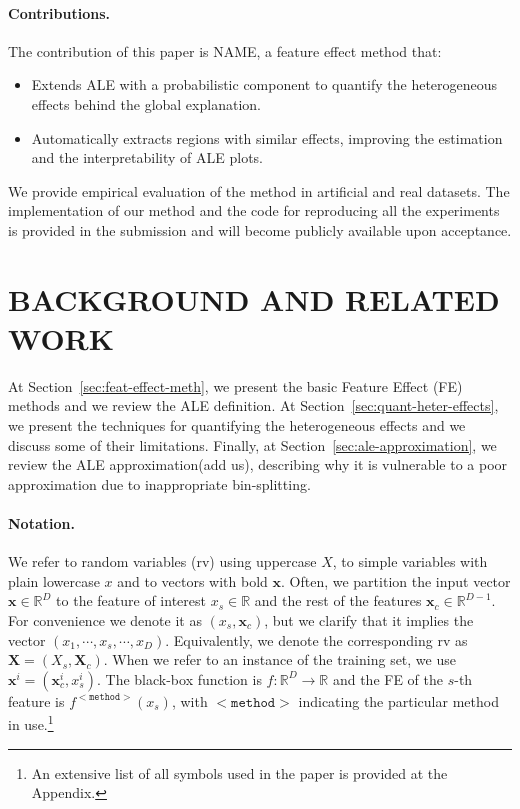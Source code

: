 \documentclass[twoside]{article}
\newcommand{\xc}{\mathbf{x}_c}
\newcommand{\xb}{\mathbf{x}}
\begin{document}
\paragraph{Contributions.} The contribution of this paper is NAME, a
feature effect method that:

\begin{itemize}
\item Extends ALE with a probabilistic component to quantify the
  heterogeneous effects behind the global explanation.
\item Automatically extracts regions with similar effects, improving
  the estimation and the interpretability of ALE plots.
\end{itemize}

We provide empirical evaluation of the method in artificial and real
datasets. The implementation of our method and the code for
reproducing all the experiments is provided in the submission and will
become publicly available upon acceptance.


\section{BACKGROUND AND RELATED WORK}

At Section~\ref{sec:feat-effect-meth}, we present the basic Feature
Effect (FE) methods and we review the ALE
definition\citep{apley2020visualizing}. At
Section~\ref{sec:quant-heter-effects}, we present the techniques for
quantifying the heterogeneous effects and we discuss some of their
limitations. Finally, at Section~\ref{sec:ale-approximation}, we
review the ALE approximation\citep{apley2020visualizing}(add us),
describing why it is vulnerable to a poor approximation due to
inappropriate bin-splitting.

\paragraph{Notation.} We refer to random variables (rv) using
uppercase \( X \), to simple variables with plain lowercase \( x \)
and to vectors with bold \( \xb \). Often, we partition the input
vector \(\xb \in \mathbb{R}^D\) to the feature of interest
\(x_s \in \mathbb{R} \) and the rest of the features
\(\xc \in \mathbb{R}^{D-1}\). For convenience we denote it as
\((x_s, \mathbf{x}_c)\), but we clarify that it implies the vector
\((x_1, \cdots , x_s, \cdots, x_D)\). Equivalently, we denote the
corresponding rv as \(\mathbf{X} = (X_s, \mathbf{X}_c)\). When we
refer to an instance of the training set, we use
\(\xb^i= (\xc^i, x_s^i) \). The black-box function is
\(f : \mathbb{R}^D \rightarrow \mathbb{R}\) and the FE of the \(s\)-th
feature is \(f^{\mathtt{<method>}}(x_s)\), with \(\mathtt{<method>}\)
indicating the particular method in use.\footnote{An extensive list of all
  symbols used in the paper is provided at the Appendix.}
\end{document}
